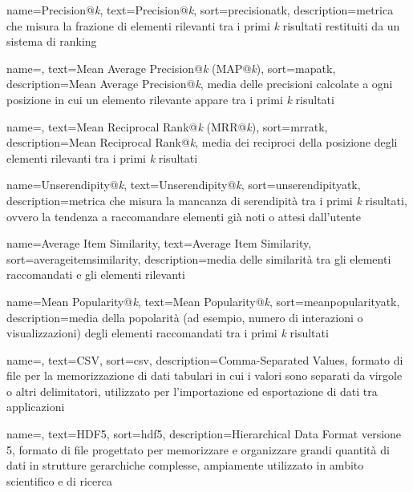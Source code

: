  {
    name=Precision@\emph{k},
    text=Precision@\emph{k},
    sort=precisionatk,
    description={metrica che misura la frazione di elementi rilevanti tra i primi \emph{k} risultati restituiti da un sistema di ranking}
}

 {
    name=,
    text=Mean Average Precision@\emph{k} (MAP@\emph{k}),
    sort=mapatk,
    description={Mean Average Precision@\emph{k}, media delle precisioni calcolate a ogni posizione in cui un elemento rilevante appare tra i primi \emph{k} risultati}
}

 {
    name=,
    text=Mean Reciprocal Rank@\emph{k} (MRR@\emph{k}),
    sort=mrratk,
    description={Mean Reciprocal Rank@\emph{k}, media dei reciproci della posizione degli elementi rilevanti tra i primi \emph{k} risultati}
}

 {
    name=Unserendipity@\emph{k},
    text=Unserendipity@\emph{k},
    sort=unserendipityatk,
    description={metrica che misura la mancanza di serendipità tra i primi \emph{k} risultati, ovvero la tendenza a raccomandare elementi già noti o attesi dall'utente}
}

 {
    name=Average Item Similarity,
    text=Average Item Similarity,
    sort=averageitemsimilarity,
    description={media delle similarità tra gli elementi raccomandati e gli elementi rilevanti}
}

 {
    name=Mean Popularity@\emph{k},
    text=Mean Popularity@\emph{k},
    sort=meanpopularityatk,
    description={media della popolarità (ad esempio, numero di interazioni o visualizzazioni) degli elementi raccomandati tra i primi \emph{k} risultati}
}

 {
    name=,
    text=CSV,
    sort=csv,
    description={Comma-Separated Values, formato di file per la memorizzazione di dati tabulari in cui i valori sono separati da virgole o altri delimitatori, utilizzato per l'importazione ed esportazione di dati tra applicazioni}
}

 {
    name=,
    text=HDF5,
    sort=hdf5,
    description={Hierarchical Data Format versione 5, formato di file progettato per memorizzare e organizzare grandi quantità di dati in strutture gerarchiche complesse, ampiamente utilizzato in ambito scientifico e di ricerca}
}

